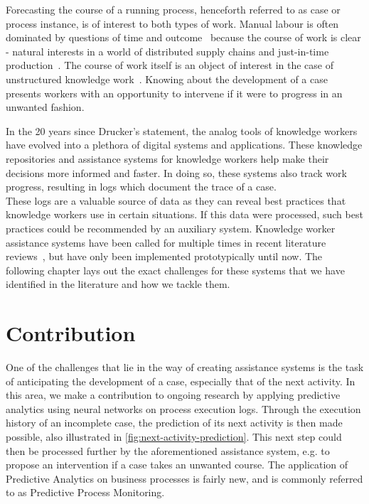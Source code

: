 Forecasting the course of a running process, henceforth referred to as case or process instance, is of interest to both types of work. Manual labour is often dominated by questions of time and outcome~\cite{rogge2013} because the course of work is clear - natural interests in a world of distributed supply chains and just-in-time production~\cite{web:economist:jit}. The course of work itself is an object of interest in the case of unstructured knowledge work~\cite{francescomarino2015}. Knowing about the development of a case presents workers with an opportunity to intervene if it were to progress in an unwanted fashion.

In the 20 years since Drucker's statement, the analog tools of knowledge workers have evolved into a plethora of digital systems and applications. These knowledge repositories and assistance systems for knowledge workers help make their decisions more informed and faster. In doing so, these systems also track work progress, resulting in logs which document the trace of a case.\\

These logs are a valuable source of data as they can reveal best practices that knowledge workers use in certain situations. If this data were processed, such best practices could be recommended by an auxiliary system. Knowledge worker assistance systems have been called for multiple times in recent literature reviews~\cite{hauder2014, francescomarino2018}, but have only been implemented prototypically until now. The following chapter lays out the exact challenges for these systems that we have identified in the literature and how we tackle them.

\section{Contribution}\label{sec:intro:contribution}
One of the challenges that lie in the way of creating assistance systems is the task of anticipating the development of a case, especially that of the next activity. In this area, we make a contribution to ongoing research by applying predictive analytics using neural networks on process execution logs. Through the execution history of an incomplete case, the prediction of its next activity is then made possible, also illustrated in \autoref{fig:next-activity-prediction}. This next step could then be processed further by the aforementioned assistance system, e.g. to propose an intervention if a case takes an unwanted course. The application of Predictive Analytics on business processes is fairly new, and is commonly referred to as Predictive Process Monitoring.\\

